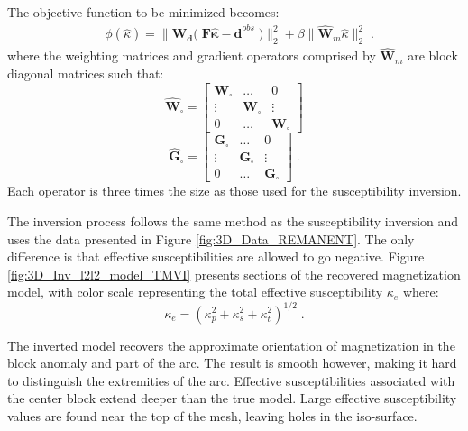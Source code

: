The objective function to be minimized becomes:
 \begin{equation} \label{eq:phi_MVI}
\begin{aligned}
&\phi (\hat\kappa) =  \|\mathbf{W_d (\;F \hat \kappa - d}^{obs}\;)\|_2^2 + \beta \| \mathbf{\hat W}_m\hat \kappa \|^2_2\;.
\end{aligned}
\end{equation}
where the weighting matrices and gradient operators comprised by $\mathbf{\hat W}_m$ are block diagonal matrices such that:
\begin{equation*}
\mathbf{\hat W}_\square = 
		\begin{bmatrix}
			\mathbf{W}_\square 		& \dots  		&  0 \\
			\vdots 		&   	\mathbf{W}_\square	&   \vdots \\
			0 		& 	\dots		& \mathbf{W}_\square
		 \end{bmatrix}
\end{equation*}
\begin{equation*}
\mathbf{\hat G}_\square = 
		\begin{bmatrix}
			\mathbf{G}_\square 		& \dots  		&  0 \\
			\vdots 		&   	\mathbf{G}_\square	&   \vdots \\
			0 		& 	\dots		& \mathbf{G}_\square
		 \end{bmatrix}\;.
\end{equation*}
Each operator is three times the size as those used for the susceptibility inversion.

The inversion process follows the same method as the susceptibility inversion and uses the data presented in Figure \ref{fig:3D_Data_REMANENT}. 
The only difference is that effective susceptibilities are allowed to go negative.
Figure \ref{fig:3D_Inv_l2l2_model_TMVI} presents sections of the recovered magnetization model, with color scale representing the total effective susceptibility $\kappa_e$ where:
\begin{equation}
 \kappa_e = {( \kappa_p^2 + \kappa_s^2 + \kappa_t^2)}^{1/2}\;.
\end{equation}

The inverted model recovers the approximate orientation of magnetization in the block anomaly and part of the arc.
The result is smooth however, making it hard to distinguish the extremities of the arc. 
Effective susceptibilities associated with the center block extend deeper than the true model. 
Large effective susceptibility values are found near the top of the mesh, leaving holes in the iso-surface.

